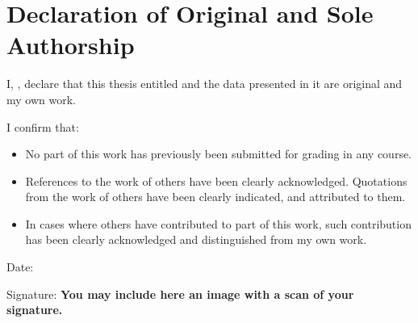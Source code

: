 \section*{Declaration of Original and Sole Authorship} 

I, \name, declare that this thesis entitled \emph{\ibtitle} and the data presented in it are original and my own work. 


I confirm that:
\begin{itemize}
\item No part of this work has previously been submitted for grading in any course.
\item References to the work of others have been clearly acknowledged. Quotations from the work of others have been clearly indicated, and attributed to them.
\item In cases where others have contributed to part of this work, such contribution has been clearly acknowledged and distinguished from my own work.
\end{itemize}

Date:  \submissiondate

Signature: \textbf{You may include here an image with a scan of your signature.}





